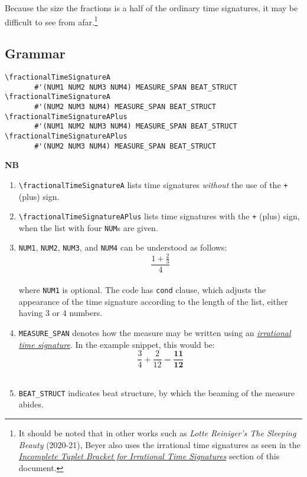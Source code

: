 Because the size the fractions is a half of the ordinary time signatures, it may be difficult to see from afar.\footnote{It should be noted that in other works such as \textit{Lotte Reiniger's The Sleeping Beauty} (2020-21), Beyer also uses the irrational time signatures as seen in the \hyperref[sec:incompleteTuplet]{\textit{Incomplete Tuplet Bracket for Irrational Time Signatures}} section of this document.} 
\label{sec:time_signatures_styleA_convention}

\subsection{Grammar}
\begin{verbatim}
\fractionalTimeSignatureA 
       #'(NUM1 NUM2 NUM3 NUM4) MEASURE_SPAN BEAT_STRUCT
\fractionalTimeSignatureA 
       #'(NUM2 NUM3 NUM4) MEASURE_SPAN BEAT_STRUCT
\fractionalTimeSignatureAPlus 
       #'(NUM1 NUM2 NUM3 NUM4) MEASURE_SPAN BEAT_STRUCT
\fractionalTimeSignatureAPlus 
       #'(NUM2 NUM3 NUM4) MEASURE_SPAN BEAT_STRUCT
\end{verbatim}
\textbf{NB} 
\begin{enumerate}
\item \verb|\fractionalTimeSignatureA| lists time signatures \textit{without} the use of the \verb|+| (plus) sign. 
\item \verb|\fractionalTimeSignatureAPlus| lists time signatures with the \verb|+| (plus) sign, when the list with four \verb|NUM|s are given.
\item \verb|NUM1|, \verb|NUM2|, \verb|NUM3|, and \verb|NUM4| can be understood as follows: \\
\[ \frac{1+\frac{2}{3}}{4} \] \\
where \verb|NUM1| is optional. The code has \verb|cond| clause, which adjusts the appearance of the time signature according to the length of the list, either having 3 or 4 numbers.
\item \verb|MEASURE_SPAN| denotes how the measure may be written using an \hyperref[sec:incompleteTuplet]{\textit{irrational time signature}}. In the example snippet, this would be: \\
\[ \frac{3}{4} + \frac{2}{12} = \mathbf{\frac{11}{12}}\] \\
\item \verb |BEAT_STRUCT| indicates beat structure, by which the beaming of the measure abides.
\end{enumerate}
